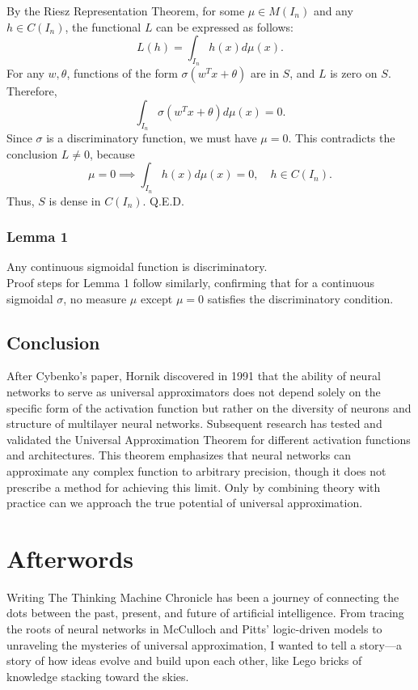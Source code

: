 \documentclass[11p,oneside]{book}
\begin{document}
By the Riesz Representation Theorem, for some $\mu \in M(I_n)$ and any $h \in C(I_n)$, the functional $L$ can be expressed as follows:
\[
L(h) = \int_{I_n} h(x) d\mu(x).
\]
For any $w, \theta$, functions of the form $\sigma(w^T x + \theta)$ are in $S$, and $L$ is zero on $S$. Therefore,
\[
\int_{I_n} \sigma(w^T x + \theta) d\mu(x) = 0.
\]
Since $\sigma$ is a discriminatory function, we must have $\mu = 0$. This contradicts the conclusion $L \neq 0$, because
\[
\mu = 0 \implies \int_{I_n} h(x) d\mu(x) = 0, \quad h \in C(I_n).
\]
Thus, $S$ is dense in $C(I_n)$. Q.E.D.

\subsection*{Lemma 1}
Any continuous sigmoidal function is discriminatory.
\\

Proof steps for Lemma 1 follow similarly, confirming that for a continuous sigmoidal $\sigma$, no measure $\mu$ except $\mu = 0$ satisfies the discriminatory condition.

\section*{Conclusion}

After Cybenko’s paper, Hornik discovered in 1991 that the ability of neural networks to serve as universal approximators does not depend solely on the specific form of the activation function but rather on the diversity of neurons and structure of multilayer neural networks. Subsequent research has tested and validated the Universal Approximation Theorem for different activation functions and architectures. This theorem emphasizes that neural networks can approximate any complex function to arbitrary precision, though it does not prescribe a method for achieving this limit. Only by combining theory with practice can we approach the true potential of universal approximation.

\chapter{Afterwords}

Writing The Thinking Machine Chronicle has been a journey of connecting the dots between the past, present, and future of artificial intelligence. From tracing the roots of neural networks in McCulloch and Pitts’ logic-driven models to unraveling the mysteries of universal approximation, I wanted to tell a story—a story of how ideas evolve and build upon each other, like Lego bricks of knowledge stacking toward the skies.
\\
\end{document}
